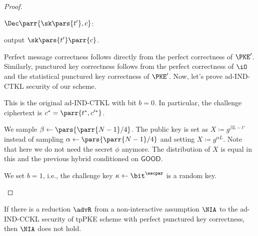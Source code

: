 \begin{proof}
\begin{sitemize}
        \item \(\Dec\parr{\sk\pars{t'},c}\):
        \begin{sitemize}
            \item output \(\sk\pars{t'}\parr{c}\).
        \end{sitemize}
    \end{sitemize}
    Perfect message correctness follows directly from the perfect correctness of \(\PKE'\).
    Similarly, punctured key correctness follows from the perfect correctness of \(\iO\) and the statistical punctured key correctness of \(\PKE'\).
    Now, let's prove ad-IND-CTKL security of our scheme.
    \begin{hybrids}
        \item This is the original ad-IND-CTKL with bit \(b = 0\).
        In particular, the challenge ciphertext is \(c^* = \parr{t^*,c'^*}\).

        \item We sample \(\beta \gets \pars{\parr{N-1}/4}\).
        The public key is set as \(X \coloneqq g^{\beta L - t'}\) instead of sampling \(\alpha \gets \pars{\parr{N-1}/4}\) and setting \(X \coloneqq g^{\alpha L}\).
        Note that here we do not need the secret \(\phi\) anymore.
        The distribution of \(X\) is equal in this and the previous hybrid conditioned on \(\textsf{GOOD}\).

        \item We set \(b = 1\), i.e., the challenge key \(\kappa \gets \bit^\secpar\) is a random key.
    \end{hybrids}
\end{proof}



\begin{theorem}
    If there is a reduction \(\advR\) from a non-interactive assumption \(\NIA\) to the ad-IND-CCKL security of tpPKE scheme with perfect punctured key correctness,
    then \(\NIA\) does not hold.
\end{theorem}

